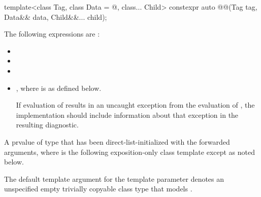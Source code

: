 \begin{itemdecl}
template<class Tag, class Data = @\seebelow@, class... Child>
  constexpr auto @@(Tag tag, Data&& data, Child&&... child);
\end{itemdecl}

\begin{itemdescr}
\pnum
\mandates
The following expressions are :
\begin{itemize}
\item {}
\item {}
\item {}
\item%
,
where  is
as defined below.

 \recommended
If evaluation of  results in
an uncaught exception from
the evaluation of ,
the implementation should include information about that exception in
the resulting diagnostic.
\end{itemize}

\pnum
\returns
A prvalue of
type 
that has been direct-list-initialized with the forwarded arguments,
where  is the following exposition-only class template except as noted below.

\pnum
\remarks
The default template argument for the  template parameter
denotes an unspecified empty trivially copyable class type
that models .
\end{itemdescr}

